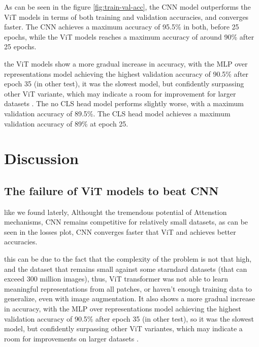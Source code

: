 \documentclass[twocolumn,superscriptaddress,aps]{revtex4-1}
\begin{document}
As can be seen in the figure \ref{fig:train-val-acc}, the CNN model outperforms the ViT models in terms of both training and validation accuracies, and converges faster. The CNN achieves a maximum accuracy of 95.5\% in both, before 25 epochs, while the ViT models reaches a maximum accuracy of around 90\% after 25 epochs.

the ViT models show a more gradual increase in accuracy, with the MLP over representations model achieving the highest validation accuracy of 90.5\% after epoch 35 (in other test), it was the slowest model, but confidently surpassing other ViT variante, which may indicate a room for improvement for larger datasets . The no CLS head model performs slightly worse, with a maximum validation accuracy of 89.5\%. The CLS head model achieves a maximum validation accuracy of 89\% at epoch 25.



\section{Discussion} %

\subsection{The failure of ViT models to beat CNN}

like we found laterly, Althought the tremendous potential of Attenstion mechanisms, CNN remains competitive for relatively small datasets, as can be seen in the losses plot, CNN converges faster that ViT and achieves better accuracies.

this can be due to the fact that the complexity of the problem is not that high, and the dataset that remains small against some starndard datasets (that can exceed 300 million images), thus, ViT transformer was not able to learn meaningful representations from all patches, or haven't enough training data to generalize, even with image augmentation. It also shows a more gradual increase in accuracy, with the MLP over representations model achieving the highest validation accuracy of 90.5\% after epoch 35 (in other test), so it was the slowest model, but confidently surpassing other ViT variantes, which may indicate a room for improvements on larger datasets .
\end{document}
